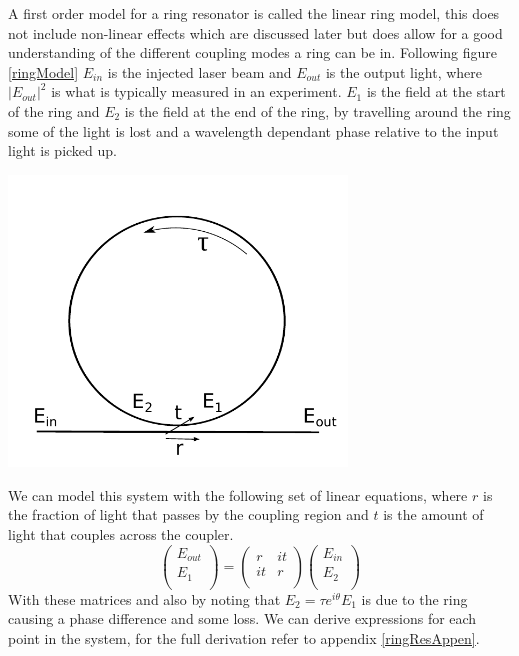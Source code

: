 A first order model for a ring resonator is called the linear ring model, this does not include non-linear effects which are discussed later but does allow for a good understanding of the different coupling modes a ring can be in. Following figure \ref{ringModel} $E_{in}$ is the injected laser beam and $E_{out}$ is the output light, where $|E_{out}|^2$ is what is typically measured in an experiment. $E_{1}$ is the field at the start of the ring and $E_2$ is the field at the end of the ring, by travelling around the ring some of the light is lost and a wavelength dependant phase relative to the input light is picked up.

\begingroup
\centering
    \includegraphics[width=9cm]{img/theory/ring.pdf} \label{ringModel}
\endgroup

We can model this system with the following set of linear equations, where $r$ is the fraction of light that passes by the coupling region and $t$ is the amount of light that couples across the coupler.
\begin{equation}
\begin{pmatrix}
E_{out} \\
E_{1} \\
\end{pmatrix}
=
\begin{pmatrix}
r & it \\
it & r \\
\end{pmatrix}
\begin{pmatrix}
E_{in} \\
E_{2} \\
\end{pmatrix}
\end{equation}
\noindent
With these matrices and also by noting that $E_2=\tau e^{i\theta}E_1$ is due to the ring causing a phase difference and some loss. We can derive expressions for each point in the system, for the full derivation refer to appendix \ref{ringResAppen}.

